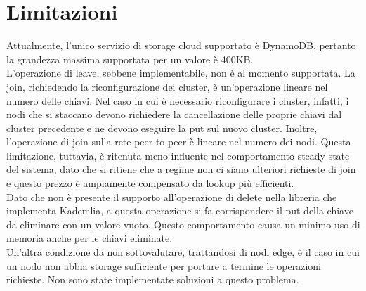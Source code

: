 \documentclass[conference]{IEEEtran}
\begin{document}
\section{Limitazioni}
Attualmente, l'unico servizio di storage cloud supportato è DynamoDB, pertanto la grandezza massima supportata per un valore
è 400KB.\cite{dynamo}\\
L'operazione di leave, sebbene implementabile, non è al momento supportata. La join, richiedendo la riconfigurazione dei cluster,
è un'operazione lineare nel numero delle chiavi. Nel caso in cui è necessario riconfigurare i cluster, infatti, i nodi che si staccano
devono richiedere la cancellazione delle proprie chiavi dal cluster precedente e ne devono eseguire la put sul nuovo cluster.
Inoltre, l'operazione di join sulla rete peer-to-peer è lineare nel numero dei nodi. Questa limitazione, tuttavia, è ritenuta
meno influente nel comportamento steady-state del sistema, dato che si ritiene che a regime non ci siano ulteriori richieste di join e questo
prezzo è ampiamente compensato da lookup più efficienti.\\
Dato che non è presente il supporto all'operazione di delete nella libreria che implementa Kademlia, a questa operazione
si fa corrispondere il put della chiave da eliminare con un valore vuoto. Questo comportamento causa un minimo uso di memoria anche
per le chiavi eliminate.\\
Un'altra condizione da non sottovalutare, trattandosi di nodi edge, è il caso in cui un nodo non abbia storage sufficiente per
portare a termine le operazioni richieste. Non sono state implementate soluzioni a questo problema.
\end{document}
